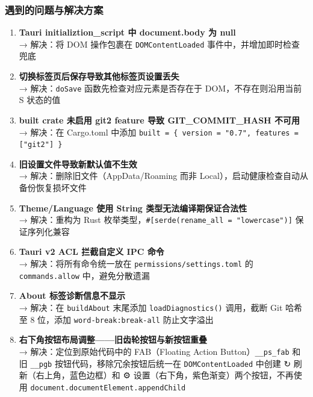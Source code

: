 \documentclass[12pt,a4paper]{ctexart}
\begin{document}
\subsubsection{遇到的问题与解决方案}

\begin{enumerate}[label=(\arabic*)]
  \item \textbf{Tauri initializtion\_script 中 document.body 为 null}
    \\→ 解决：将 DOM 操作包裹在 \texttt{DOMContentLoaded} 事件中，并增加即时检查兜底

  \item \textbf{切换标签页后保存导致其他标签页设置丢失}
    \\→ 解决：\texttt{doSave} 函数先检查对应元素是否存在于 DOM，不存在则沿用当前 S 状态的值

  \item \textbf{built crate 未启用 git2 feature 导致 GIT\_COMMIT\_HASH 不可用}
    \\→ 解决：在 Cargo.toml 中添加 \texttt{built = \{ version = "0.7", features = ["git2"] \}}

  \item \textbf{旧设置文件导致新默认值不生效}
    \\→ 解决：删除旧文件（AppData/Roaming 而非 Local），启动健康检查自动从备份恢复损坏文件

  \item \textbf{Theme/Language 使用 String 类型无法编译期保证合法性}
    \\→ 解决：重构为 Rust 枚举类型，\texttt{\#[serde(rename\_all = "lowercase")]} 保证序列化兼容

  \item \textbf{Tauri v2 ACL 拦截自定义 IPC 命令}
    \\→ 解决：将所有命令统一放在 \texttt{permissions/settings.toml} 的 \texttt{commands.allow} 中，避免分散遗漏

  \item \textbf{About 标签诊断信息不显示}
    \\→ 解决：在 \texttt{buildAbout} 末尾添加 \texttt{loadDiagnostics()} 调用，截断 Git 哈希至 8 位，添加 \texttt{word-break:break-all} 防止文字溢出

  \item \textbf{右下角按钮布局调整——旧齿轮按钮与新按钮重叠}
    \\→ 解决：定位到原始代码中的 FAB（Floating Action Button）\texttt{\_\_ps\_fab} 和旧 \texttt{\_\_pgb} 按钮代码，移除冗余按钮后统一在 \texttt{DOMContentLoaded} 中创建 ↻ 刷新（右上角，蓝色边框）和 ⚙ 设置（右下角，紫色渐变）两个按钮，不再使用 \texttt{document.documentElement.appendChild}
\end{enumerate}
\end{document}
